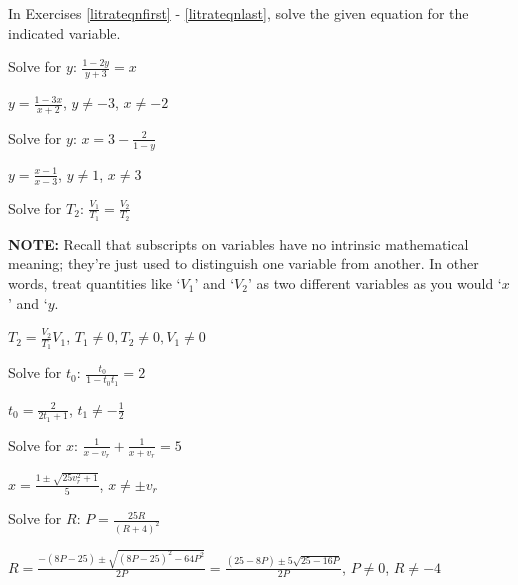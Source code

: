 \documentclass{ximera}
\begin{document}
\begin{question}
In Exercises \ref{litrateqnfirst} - \ref{litrateqnlast}, solve the given equation for the indicated variable.

\begin{problem} \label{litrateqnfirst}
Solve for $y$:  $\frac{1-2y}{y+3} = x$ 

\begin{solution}
 $y = \frac{1 - 3x}{x+2}$, $y \neq -3$, $x \neq -2$
\end{solution}
\end{problem}

\begin{problem}
Solve for $y$: $x = 3 - \frac{2}{1-y}$

\begin{solution}
$y = \frac{x-1}{x-3}$, $y \neq 1$, $x \neq 3$
\end{solution}
\end{problem}

\begin{problem} Solve for $T_{2}$: $\frac{V_{1}}{T_{1}} = \frac{V_{2}}{T_{2}}$

\textbf{NOTE:}  Recall that subscripts on variables have no intrinsic mathematical meaning; they're just used to distinguish one variable from another.  In other words, treat quantities like `$V_{1}$' and `$V_{2}$'  as two different variables as you would `$x$' and `$y$.
\end{problem}

\begin{solution}
$T_{2} = \frac{V_{2}}{T_{1}}{V_{1}}$, $T_{1} \neq 0, T_{2} \neq 0, V_{1} \neq 0$
\end{solution}

\begin{problem}
Solve for $t_{0}$:  $\frac{t_{0}}{1-t_{0}t_{1}} = 2$ 

\begin{solution}
$t_{0} = \frac{2}{2t_{1} + 1}$, $t_{1} \neq -\frac{1}{2}$
\end{solution}
\end{problem}

\begin{problem} 
Solve for $x$:  $\frac{1}{x - v_{r}} + \frac{1}{x + v_{r}} = 5$

\begin{solution}
$x = \frac{1 \pm \sqrt{25v_{r}^2+1}}{5}$, $x \neq \pm v_{r}$
\end{solution}
\end{problem}

\begin{problem} \label{litrateqnlast}
Solve for $R$:  $P = \frac{25R}{(R+4)^2}$ 

\begin{solution}
$R= \frac{-(8P-25) \pm \sqrt{(8P-25)^2 - 64P^2}}{2P} = \frac{(25-8P) \pm 5 \sqrt{25-16P}}{2P}$, $P \neq 0$, $R \neq -4$
\end{solution}
\end{problem}

\end{question}
\end{document}
